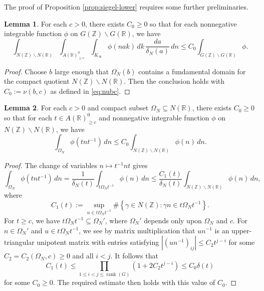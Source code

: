 \documentclass[reqno]{amsart}
\DeclareMathOperator{\rank}{rank}
\theoremstyle{plain} \newtheorem{theorem} {Theorem}
\theoremstyle{definition} \newtheorem{definition} [theorem] {Definition}
\theoremstyle{itplain} %
\newtheorem{lemma}[theorem]{Lemma}
\numberwithin{equation}{section}
\numberwithin{theorem}{section}
\renewcommand{\geq}{\geqslant}
\renewcommand{\leq}{\leqslant}
\begin{document}
The proof of Proposition \ref{prop:siegel-lower} requires some further preliminaries.
\begin{lemma}\label{lem:siegel-upper-basic}
  For each $c > 0$, there exists $C_0 \geq 0$ so that for each nonnegative integrable function $\phi$ on $G(\mathbb{Z}) \backslash G(\mathbb{R})$, we have
  \begin{equation*}
    \int _{N(\mathbb{Z}) \backslash N(\mathbb{R})}
    \int _{A(\mathbb{R})^0_{\geq c}}
    \int _{K_\infty}
    \phi(n a k) \, d k \, \frac{d a}{\delta_N(a)} \, d n
    \leq C_0 \int _{G(\mathbb{Z}) \backslash G(\mathbb{R})} \phi.
  \end{equation*}
\end{lemma}
\begin{proof}
  Choose $b$ large enough that $\Omega_N(b)$ contains a fundamental domain for the compact quotient $N(\mathbb{Z}) \backslash N(\mathbb{R})$.  Then the conclusion holds with $C_0 := \nu(b,c)$ as defined in \eqref{eq:nubc}.
\end{proof}

\begin{lemma}\label{lem:scratch-research:each-c-Omega-N}
For each $c > 0$ and compact subset $\Omega_N \subseteq N(\mathbb{R})$, there exists $C_0 \geq 0$ so that for each $t \in A(\mathbb{R})^0_{\geq c}$ and nonnegative integrable function $\phi$ on $N(\mathbb{Z}) \backslash N(\mathbb{R})$, we have
\begin{equation*}
  \int _{\Omega_N}
  \phi(t n t^{-1}) \, d n \leq C_0 \int _{N(\mathbb{Z}) \backslash N(\mathbb{R})} \phi(n) \, d n.
\end{equation*}
\end{lemma}
\begin{proof}
  The change of variables $n \mapsto t^{-1} n t$ gives
  \begin{equation*}
  \int _{\Omega_N}
  \phi(t n t^{-1}) \, d n
  =
  \frac{1}{\delta_N(t)}
  \int _{t \Omega_N t^{-1}}
  \phi(n) \, d n
  \leq
  \frac{C_1(t)}{\delta_N(t)} \int _{N(\mathbb{Z}) \backslash N(\mathbb{R}) }\phi(n) \, d n,
\end{equation*}
where
\begin{equation*}
  C_1(t) := \sup_{n \in t \Omega_N t^{-1}}
  \# \left\{ \gamma \in N(\mathbb{Z}) : \gamma n \in t \Omega_N t^{-1} \right\}.
\end{equation*}
For $t \geq c$, we have $t \Omega_N t^{-1} \subseteq \Omega_N'$, where $\Omega_N'$ depends only upon $\Omega_N$ and $c$.  For $n \in \Omega_N'$ and $u \in t \Omega_N t^{-1}$, we see by matrix multiplication that $u n^{-1}$ is an upper-triangular unipotent matrix with entries satisfying $|(u n^{-1})_{i j}| \leq C_2 t^{j-i}$ for some $C_2 = C_2(\Omega_N,c) \geq 0$ and all $i < j$.  It follows that
\begin{equation*}
  C_1(t) \leq \prod_{1 \leq i < j \leq \rank(G)} (1 + 2 C_2 t^{j-i}) \leq C_0 \delta(t)
\end{equation*}
for some $C_0 \geq 0$.  The required estimate then holds with this value of $C_0$.
\end{proof}
\end{document}
